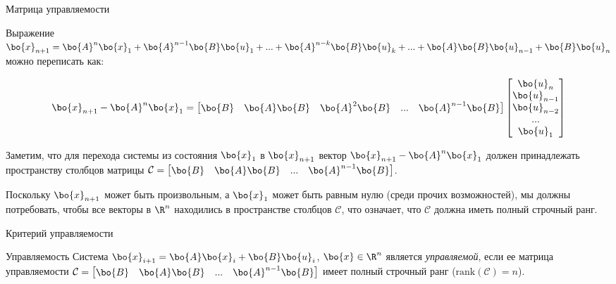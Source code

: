 \documentclass{beamer}
\begin{document}
\begin{frame}{Матрица управляемости}
	\begin{flushleft}
		
		Выражение $\bo{x}_{n+1} = \bo{A}^n \bo{x}_1 + \bo{A}^{n-1} \bo{B} \bo{u}_1 + ... 
		+ \bo{A}^{n - k} \bo{B} \bo{u}_{k} + ... +
		\bo{A} \bo{B} \bo{u}_{n-1} + \bo{B} \bo{u}_n$ можно переписать как:
		
		\begin{equation}
			\bo{x}_{n+1} - \bo{A}^n \bo{x}_1 = 
			\begin{bmatrix}
				\bo{B} &
				\bo{A} \bo{B} &
				\bo{A}^2 \bo{B} & ... &
				\bo{A}^{n - 1} \bo{B}
			\end{bmatrix}    
			\begin{bmatrix}
				\bo{u}_{n} \\
				\bo{u}_{n-1} \\
				\bo{u}_{n-2} \\ ... \\
				\bo{u}_{1}
			\end{bmatrix}
		\end{equation}
		
		Заметим, что для перехода системы из состояния $\bo{x}_1$ в $\bo{x}_{n+1}$ вектор $\bo{x}_{n+1} - \bo{A}^n \bo{x}_1$ должен принадлежать пространству столбцов матрицы $\mathcal{C} = \begin{bmatrix}
			\bo{B} &
			\bo{A} \bo{B} & ... &
			\bo{A}^{n - 1} \bo{B}
		\end{bmatrix}$.
		
		Поскольку $\bo{x}_{n+1}$ может быть произвольным, а $\bo{x}_1$ может быть равным нулю (среди прочих возможностей), мы должны потребовать, чтобы все векторы в $\R^n$ находились в пространстве столбцов $\mathcal{C}$, что означает, что $\mathcal{C}$ должна иметь полный строчный ранг.
		
	\end{flushleft}
\end{frame}


\begin{frame}{Критерий управляемости}
	\begin{flushleft}
		
		\begin{block}{Управляемость}
			Система $\bo{x}_{i+1} = \bo{A}  \bo{x}_i + \bo{B} \bo{u}_i$, $\bo{x} \in \R^n$ является \emph{управляемой}, если ее матрица управляемости $\mathcal{C} = \begin{bmatrix}
				\bo{B} &
				\bo{A} \bo{B} & ... &
				\bo{A}^{n - 1} \bo{B}
			\end{bmatrix}$ имеет полный строчный ранг ($\text{rank}(\mathcal{C}) = n$).
		\end{block}
		
	\end{flushleft}
\end{frame}
\end{document}
